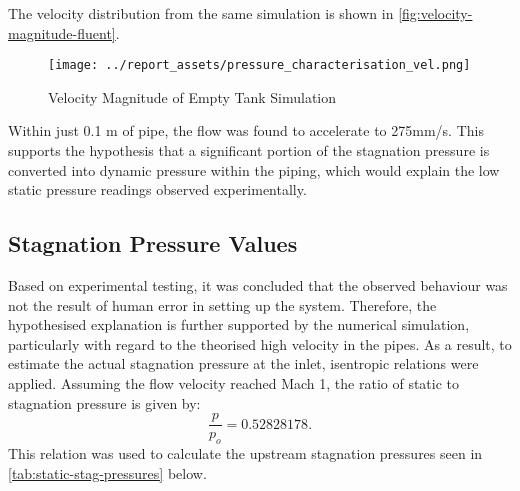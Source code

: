 The velocity distribution from the same simulation is shown in \autoref{fig:velocity-magnitude-fluent}.
\begin{figure}[htbp]
    \centering
    
    \begin{minipage}{0.9\textwidth}
        \centering
        \texttt{[image: ../report\_assets/pressure\_characterisation\_vel.png]}
        \caption{Velocity Magnitude of Empty Tank Simulation}\label{fig:velocity-magnitude-fluent}
    \end{minipage}    
    
\end{figure}    
Within just 0.1 m of pipe, the flow was found to accelerate to 275mm/s. This supports the hypothesis that a significant portion of the stagnation pressure is converted into dynamic pressure within the piping, which would explain the low static pressure readings observed experimentally.

\subsection{Stagnation Pressure Values}
Based on experimental testing, it was concluded that the observed behaviour was not the result of human error in setting up the system. Therefore, the hypothesised explanation is further supported by the numerical simulation, particularly with regard to the theorised high velocity in the pipes. As a result, to estimate the actual stagnation pressure at the inlet, isentropic relations were applied. Assuming the flow velocity reached Mach 1, the ratio of static to stagnation pressure is given by:
\[
\frac{p}{p_o} = 0.52828178.
\]
This relation was used to calculate the upstream stagnation pressures seen in \autoref{tab:static-stag-pressures} below.

    
